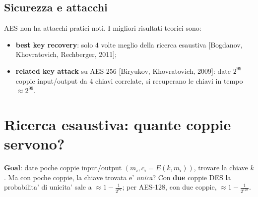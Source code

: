 \subsection{Sicurezza e attacchi}
AES non ha attacchi pratici noti. I migliori risultati teorici sono:
\begin{itemize}
  \item \textbf{best key recovery}: solo $ 4 $ volte meglio della ricerca esaustiva [Bogdanov, Khovratovich, Rechberger, 2011];
  \item \textbf{related key attack} su AES-256 [Biryukov, Khovratovich, 2009]: date $ 2^{99} $ coppie input/output da $ 4 $ chiavi correlate, si recuperano le chiavi in tempo $ \approx 2^{99} $.
\end{itemize}

\section{Ricerca esaustiva: quante coppie servono?}
\textbf{Goal}: date poche coppie input/output $ (m_i, c_i = E(k, m_i)) $, trovare la chiave $ k $. Ma con poche coppie, la chiave trovata e' \textit{unica}?
Con \textbf{due} coppie DES la probabilita' di unicita' sale a $ \approx 1 - \tfrac{1}{2^{71}} $; per AES-128, con due coppie, $ \approx 1 - \tfrac{1}{2^{128}} $.

% 
